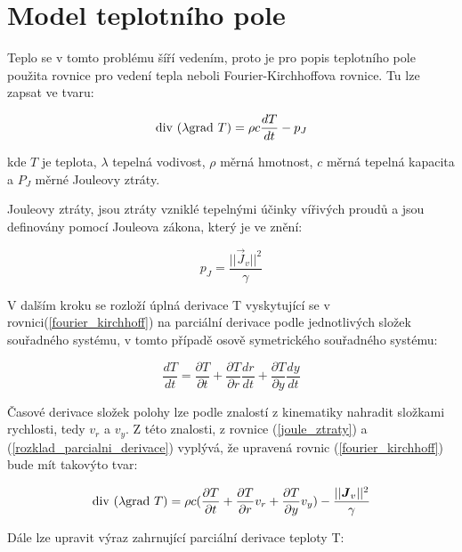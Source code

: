 \newpage

\section{Model teplotního pole}
Teplo se v tomto problému šíří vedením, proto je pro popis teplotního pole použita rovnice pro vedení tepla neboli Fourier-Kirchhoffova rovnice. Tu lze zapsat ve tvaru:

\begin{equation}
	\mathrm{div}\  ( \lambda  \mathrm{grad}\  T) = \rho c \frac{dT}{dt} - p_J 
	\label{fourier_kirchhoff} 
\end{equation} \cite{TZEP}

kde $T$ je teplota, $\lambda$ tepelná vodivost, $\rho$ měrná hmotnost, $c$ měrná tepelná kapacita a   $P_J$ měrné Jouleovy ztráty.

Jouleovy ztráty, jsou ztráty vzniklé tepelnými účinky vířivých proudů a jsou definovány pomocí Jouleova zákona, který je ve znění:

\begin{equation}
	p_{J}=\frac{||\vec{J}_{v}||^{2}}{\gamma}
	\label{joule_ztraty} 
\end{equation} 

V dalším kroku se rozloží úplná derivace T vyskytující se v rovnici(\ref{fourier_kirchhoff}) na parciální derivace podle jednotlivých složek souřadného systému, v tomto případě osově symetrického souřadného systému:

\begin{equation}
	\frac{dT}{dt} =\frac{\partial T}{\partial t} + \frac{\partial T}{\partial r} \frac{d r}{d t} + \frac{\partial T}{\partial y} \frac{d y}{d t}
	\label{rozklad_parcialni_derivace} 
\end{equation}

Časové derivace složek polohy lze podle znalostí z kinematiky nahradit složkami rychlosti, tedy $v_r$ a $v_y$. Z této znalosti, z rovnice (\ref{joule_ztraty}) a (\ref{rozklad_parcialni_derivace}) vyplývá, že upravená rovnic (\ref{fourier_kirchhoff}) bude mít takovýto tvar:

\begin{equation}
	\mathrm{div}\  ( \lambda  \mathrm{grad}\  T) = \rho c (\frac{\partial T}{\partial t} + \frac{\partial T}{\partial r} v_r + \frac{\partial T}{\partial y} v_y) - \frac{||\mbox{\boldmath$J$}_{v}||^{2}}{\gamma}
	\label{fourier_kirchhoff_upraven} 
\end{equation} 

Dále lze upravit výraz zahrnující parciální derivace teploty T:

